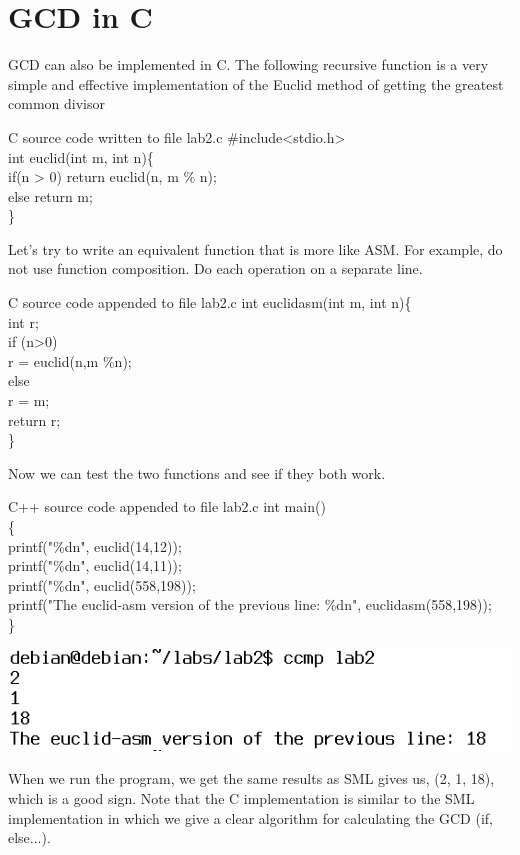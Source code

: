 \documentclass{article}
\begin{document}
\clearpage
\section{GCD in C}
GCD can also be implemented in C. The following recursive function is a very simple and effective implementation of the Euclid method of getting the greatest common divisor 
\begin{GFT}{C source code written to file lab2.c}
\+\#include<stdio.h>\\
\+int euclid(int m, int n)\{\\
\+  if(n > 0) return euclid(n, m \% n);\\
\+  else return m;\\
\+\}\\
\end{GFT}

Let's try to write an equivalent function that is more like ASM. For example,
do not use function composition. Do each operation on a separate line. 
\begin{GFT}{C source code appended to file lab2.c}
\+int euclidasm(int m, int n)\{\\
\+  int r;\\
\+  if (n>0)\\
\+    r = euclid(n,m \%n);\\
\+  else \\
\+    r = m;\\
\+  return r;\\
\+\}\\
\end{GFT}
Now we can test the two functions and see if they both work.
\begin{GFT}{C++ source code appended to file lab2.c}
\+int main()\\
\+\{\\
\+  printf("\%d\Backslash{}n", euclid(14,12));\\
\+  printf("\%d\Backslash{}n", euclid(14,11));\\
\+  printf("\%d\Backslash{}n", euclid(558,198));\\
\+  printf("The euclid-asm version of the previous line: \%d\Backslash{}n", euclidasm(558,198));\\
\+\}\\
\end{GFT}
\includegraphics[scale =0.5]{gcd_c.png}
\par When we run the program, we get the same results as SML gives us, (2, 1, 18), which is a good sign. Note that the C implementation is similar to the SML implementation in which we give a clear algorithm for calculating the GCD (if, else...). 
\end{document}
